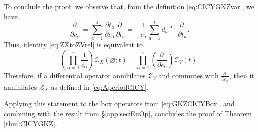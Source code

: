 \documentclass[12pt,a4paper,oneside]{amsart}
\numberwithin{equation}{section}
\theoremstyle{definition}
\theoremstyle{remark}
\newcommand{\mz}{\mathcal{Z}}
\begin{document}
\begin{appendix}
To conclude the proof, we observe that, from the definition \eqref{eq:CICYGKZvar}, we have 
\begin{equation*}
    \frac{\partial \ }{\partial c_{\alpha}} = \sum_{a=1}^{s} \frac{\partial t_a } {\partial c_{\alpha}} \frac{\partial \ }{\partial t_a } = - \frac{1}{c_{\alpha}} \sum_{a=1}^{s} d_a^{(\alpha)} \frac{\partial \ }{\partial t_a } . 
\end{equation*}
Thus, identity \eqref{eq:ZXtoZVrel} is equivalent to 
\begin{equation*}
	\left( \prod_{\alpha=1}^{r} \frac{1}{c_{\alpha}}\right) \mz_{X} (\varnothing ;t) = \prod_{\alpha=1}^{r} \left(\frac{\partial \ }{\partial c_{\alpha}}  \right) \mz_{V} \left( t \right) .
\end{equation*}
Therefore, if a differential operator annihilates $\mz_{V} $ and commutes with $\frac{\partial \ }{\partial c_{\alpha}}$, then it annihilates $\widehat{\mz}_X$ as defined in \eqref{eq:AperiodCICY}.\par
Applying this statement to the box operators from \eqref{eq:GKZCICYBox}, and combining with the result from \S\ref{app:sec:EuOp}, concludes the proof of Theorem \ref{thm:CICYGKZ}.







\end{appendix}
\end{document}
